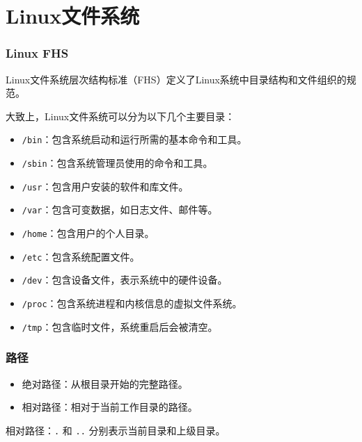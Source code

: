 \documentclass{ctexbeamer}
\begin{document}




\section{Linux文件系统}
\frame{\sectionpage}

\begin{frame}
    \frametitle{Linux FHS}

    Linux文件系统层次结构标准（FHS）定义了Linux系统中目录结构和文件组织的规范。

    大致上，Linux文件系统可以分为以下几个主要目录：
    \begin{itemize}
        \item \texttt{/bin}：包含系统启动和运行所需的基本命令和工具。
        \item \texttt{/sbin}：包含系统管理员使用的命令和工具。
        \item \texttt{/usr}：包含用户安装的软件和库文件。
        \item \texttt{/var}：包含可变数据，如日志文件、邮件等。
        \item \texttt{/home}：包含用户的个人目录。
        \item \texttt{/etc}：包含系统配置文件。
        \item \texttt{/dev}：包含设备文件，表示系统中的硬件设备。
        \item \texttt{/proc}：包含系统进程和内核信息的虚拟文件系统。
        \item \texttt{/tmp}：包含临时文件，系统重启后会被清空。
    \end{itemize}

\end{frame}

\begin{frame}
    \frametitle{路径}

    \begin{itemize}
        \item 绝对路径：从根目录开始的完整路径。
        \item 相对路径：相对于当前工作目录的路径。
    \end{itemize}

    相对路径：\texttt{.} 和 \texttt{..} 分别表示当前目录和上级目录。

\end{frame}
\end{document}
